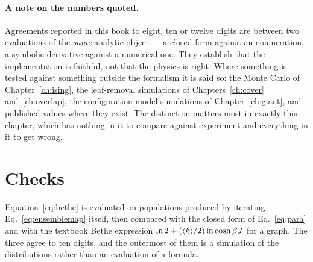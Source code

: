 \paragraph{A note on the numbers quoted.} Agreements reported in this book to
eight, ten or twelve digits are between two evaluations of the \emph{same}
analytic object --- a closed form against an enumeration, a symbolic derivative
against a numerical one. They establish that the implementation is faithful, not
that the physics is right. Where something is tested against something outside
the formalism it is said so: the Monte Carlo of Chapter~\ref{ch:ising}, the
leaf-removal simulations of Chapters~\ref{ch:cover} and~\ref{ch:overlap}, the
configuration-model simulations of Chapter~\ref{ch:giant}, and published values
where they exist. The distinction matters most in exactly this chapter, which
has nothing in it to compare against experiment and everything in it to get
wrong.

\section{Checks}
\label{sec:statmech-checks}

Equation~\eqref{eq:bethe} is evaluated on populations produced by iterating
Eq.~\eqref{eq:ensemblemap} itself, then compared with the closed form of
Eq.~\eqref{eq:para} and with the textbook Bethe expression
$\ln2+(\langle k \rangle/2)\ln\cosh\beta J$ for a graph. The three agree to ten digits, and the
outermost of them is a simulation of the distributions rather than an evaluation
of a formula.

